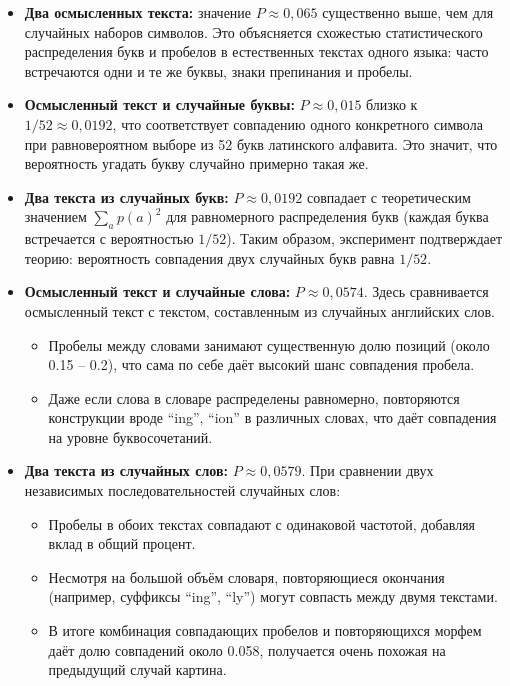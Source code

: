 \documentclass[a4paper,12pt]{article}
\begin{document}
\begin{itemize}
\item \textbf{Два осмысленных текста:} значение $P\approx0{,}065$ существенно выше, чем для случайных наборов символов. Это объясняется схожестью статистического распределения букв и пробелов в естественных текстах одного языка: часто встречаются одни и те же буквы, знаки препинания и пробелы.

\item \textbf{Осмысленный текст и случайные буквы:} $P\approx0{,}015$ близко к $1/52\approx0{,}0192$, что соответствует совпадению одного конкретного символа при равновероятном выборе из 52 букв латинского алфавита. Это значит, что вероятность угадать букву случайно примерно такая же.

\item \textbf{Два текста из случайных букв:} $P\approx0{,}0192$ совпадает с теоретическим значением $\sum_{a}p(a)^2$ для равномерного распределения букв (каждая буква встречается с вероятностью $1/52$). Таким образом, эксперимент подтверждает теорию: вероятность совпадения двух случайных букв равна $1/52$.

\item \textbf{Осмысленный текст и случайные слова:} $P\approx0{,}0574$. Здесь сравнивается осмысленный текст с текстом, составленным из случайных английских слов.
\begin{itemize}
  \item Пробелы между словами занимают существенную долю позиций (около 0.15 -- 0.2), что сама по себе даёт высокий шанс совпадения пробела.
  \item Даже если слова в словаре распределены равномерно, повторяются конструкции вроде ``ing'', ``ion'' в различных словах, что даёт совпадения на уровне буквосочетаний.
\end{itemize}

\item \textbf{Два текста из случайных слов:} $P\approx0{,}0579$. При сравнении двух независимых последовательностей случайных слов:
\begin{itemize}
  \item Пробелы в обоих текстах совпадают с одинаковой частотой, добавляя вклад в общий процент.
  \item Несмотря на большой объём словаря, повторяющиеся окончания (например, суффиксы ``ing'', ``ly'') могут совпасть между двумя текстами.
  \item В итоге комбинация совпадающих пробелов и повторяющихся морфем даёт долю совпадений около 0.058, получается очень похожая на предыдущий случай картина. 
\end{itemize}


\end{itemize}
\end{document}
